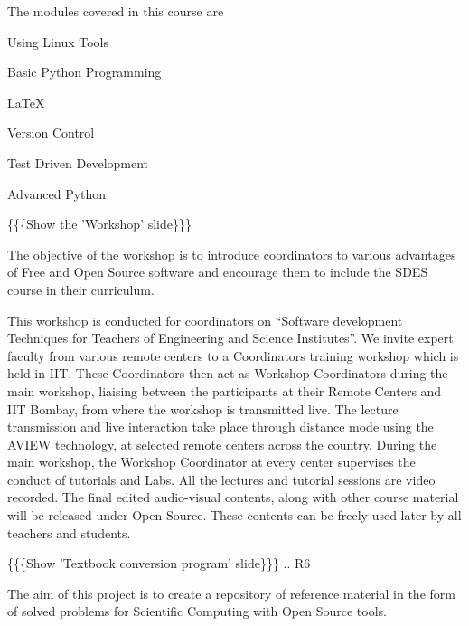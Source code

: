 \documentclass[a4paper,english]{article}
\begin{document}
The modules covered in this course are
\setcounter{listcnt0}{0}
\begin{list}{.}
{
\setlength{\rightmargin}{\leftmargin}
}

\item Using Linux Tools

\item Basic Python Programming

\item LaTeX

\item Version Control

\item Test Driven Development

\item Advanced Python
\end{list}


\{\{\{Show the 'Workshop' slide\}\}\}


The objective of the workshop is to introduce coordinators to various advantages of Free and Open Source software and encourage them to include the SDES course in their curriculum.

This workshop is conducted for coordinators on ``Software development Techniques for Teachers of Engineering and Science Institutes''.  We invite expert faculty from various remote centers to a Coordinators training workshop which is held in IIT. These Coordinators then act as Workshop Coordinators during the main workshop, liaising between the participants at their Remote Centers and IIT Bombay, from where the workshop is transmitted live. The lecture transmission and live interaction take place through distance mode using the AVIEW technology, at selected remote centers across the country. During the main workshop, the Workshop Coordinator at every center supervises the conduct of tutorials and Labs. All the lectures and tutorial sessions are video recorded. The final edited audio-visual contents, along with other course material will be released under Open Source. These contents can be freely used later by all teachers and students.


\{\{\{Show 'Textbook conversion program' slide\}\}\}
.. R6

The aim of this project is to create a repository of reference material in the form of solved problems for Scientific Computing with Open Source tools.
\end{document}
